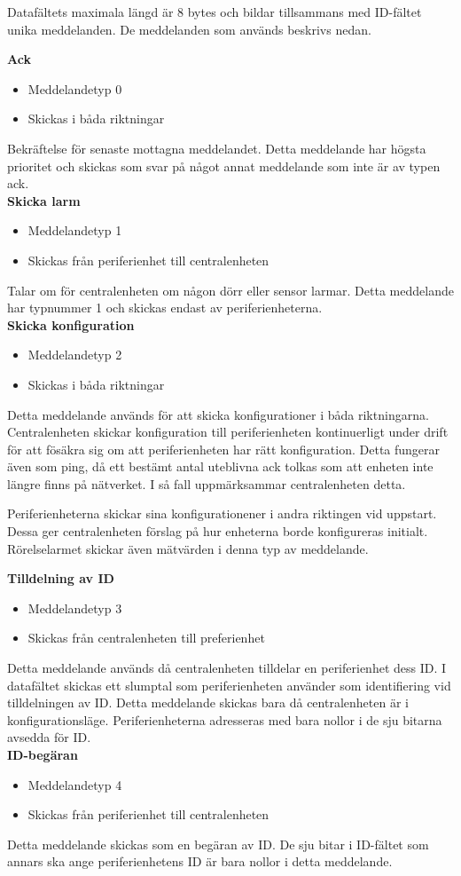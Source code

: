 Datafältets maximala längd är 8 bytes och bildar tillsammans med ID-fältet unika meddelanden. De meddelanden som används beskrivs nedan.



\textbf{Ack}
\begin{itemize}
    \item Meddelandetyp 0
    \item Skickas i båda riktningar
\end{itemize}
Bekräftelse för senaste mottagna meddelandet. Detta meddelande har högsta prioritet och skickas som svar på något annat meddelande som inte är av typen ack. \\


\textbf{Skicka larm}
\begin{itemize}
    \item Meddelandetyp 1
    \item Skickas från periferienhet till centralenheten
\end{itemize}
Talar om för centralenheten om någon dörr eller sensor larmar. Detta meddelande har typnummer 1 och skickas endast av periferienheterna. \\


\textbf{Skicka konfiguration}
\begin{itemize}
    \item Meddelandetyp 2
    \item Skickas i båda riktningar
\end{itemize}
Detta meddelande används för att skicka konfigurationer i båda riktningarna.
Centralenheten skickar konfiguration till periferienheten kontinuerligt under drift för att fösäkra sig om att periferienheten har rätt konfiguration. Detta fungerar även som ping, då ett bestämt antal uteblivna ack tolkas som att enheten inte längre finns på nätverket.
I så fall uppmärksammar centralenheten detta.

Periferienheterna skickar sina konfigurationener i andra riktingen vid uppstart.
Dessa ger centralenheten förslag på hur enheterna borde konfigureras initialt. Rörelselarmet skickar även mätvärden i denna typ av meddelande.


\textbf{Tilldelning av ID}
\begin{itemize}
    \item Meddelandetyp 3
    \item Skickas från centralenheten till preferienhet
\end{itemize}
Detta meddelande används då centralenheten tilldelar en periferienhet dess ID. I datafältet skickas ett slumptal som periferienheten använder som identifiering vid tilldelningen av ID. Detta meddelande skickas bara då centralenheten är i konfigurationsläge. Periferienheterna adresseras med bara nollor i de sju bitarna avsedda för ID. \\


\textbf{ID-begäran}
\begin{itemize}
    \item Meddelandetyp 4
    \item Skickas från periferienhet till centralenheten
\end{itemize}
Detta meddelande skickas som en begäran av ID. De sju bitar i ID-fältet som annars ska ange periferienhetens ID är bara nollor i detta meddelande.
